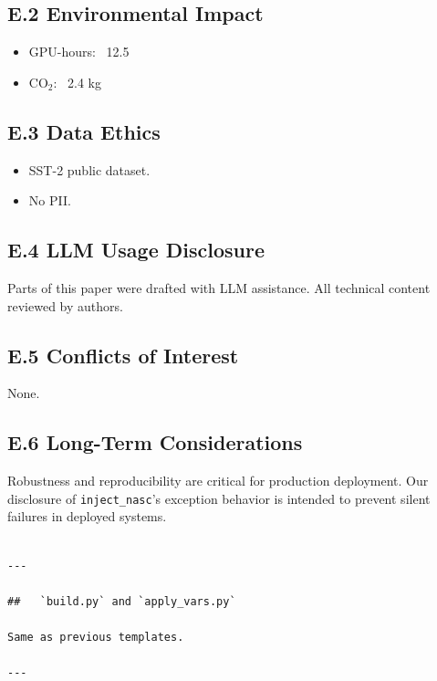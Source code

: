 \subsection{E.2 Environmental Impact}

\begin{itemize}
\item GPU-hours: ~12.5
\item CO$_2$: ~2.4 kg

\end{itemize}
\subsection{E.3 Data Ethics}

\begin{itemize}
\item SST-2 public dataset.
\item No PII.

\end{itemize}
\subsection{E.4 LLM Usage Disclosure}

Parts of this paper were drafted with LLM assistance. All technical content 
reviewed by authors.

\subsection{E.5 Conflicts of Interest}

None.

\subsection{E.6 Long-Term Considerations}

Robustness and reproducibility are critical for production deployment. 
Our disclosure of \texttt{inject\_nasc}'s exception behavior is intended to 
prevent silent failures in deployed systems.
\begin{lstlisting}

---

##   `build.py` and `apply_vars.py`

Same as previous templates.

---
\end{lstlisting}